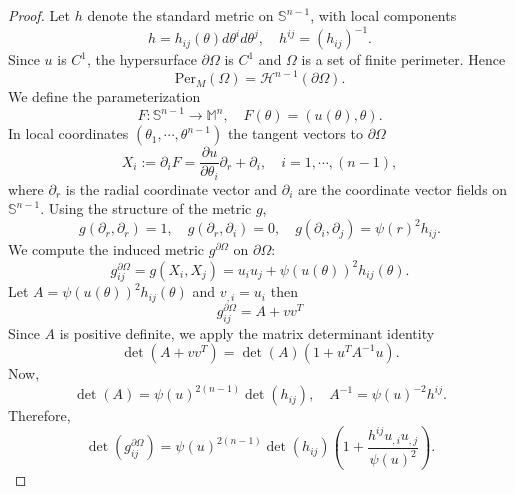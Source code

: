 \documentclass[10pt,a4paper]{amsart}
\newcommand{\m}{\mathbb{M}^n}
\newcommand{\sn}{\mathbb{S}^{n-1}}
\begin{document}
\begin{proof}
    Let $h$ denote the standard metric on $\sn$, with local components
    \begin{equation*}
        h=h_{ij}(\theta)d\theta^id\theta^j,\quad h^{ij}=(h_{ij})^{-1}.
    \end{equation*}
    Since $u$ is $C^1$, the hypersurface $\partial \Omega$ is $C^1$ and $\Omega$ is a set of finite perimeter. Hence
    \begin{equation*}
        \text{Per}_{M}(\Omega)=\mathcal{H}^{n-1}(\partial \Omega).
    \end{equation*}
    We define the parameterization 
    \begin{equation*}
        F: \sn\to \m, \quad F(\theta)=(u(\theta),\theta).
    \end{equation*}
    In local coordinates $(\theta_1,\cdots, \theta^{n-1})$ the tangent vectors to $\partial \Omega$ 
    \begin{equation*}
        X_i:=\partial_i F=\frac{\partial u}{\partial \theta_i}\partial_r+\partial_i,\quad i=1,\cdots, (n-1),
    \end{equation*}
    where $\partial_r$ is the radial coordinate vector and $\partial_i$  are the coordinate vector fields on $\sn$.
Using the structure of the metric $g$,
\begin{equation*}
    g(\partial_r, \partial_r)=1,\quad g(\partial_r, \partial_i)=0,\quad g(\partial_i,\partial_j)=\psi(r)^2h_{ij}.
\end{equation*}
We compute the induced metric $g^{\partial \Omega}$ on $\partial \Omega$: 
\begin{equation*}
    g_{ij}^{\partial \Omega}= g(X_i, X_j)= u_iu_j+\psi(u(\theta))^2h_{ij}(\theta).
\end{equation*}
Let $A=\psi(u(\theta))^2h_{ij}(\theta)$ and $v_{,i}=u_i$ then
\begin{equation*}
    g_{ij}^{\partial \Omega}=A+vv^{T}
\end{equation*}
Since $A$ is positive definite, we apply the matrix determinant identity
\begin{equation*}
    \det(A+vv^T)=\det(A)(1+u^TA^{-1}u).
\end{equation*}
   Now,
   \begin{equation*}
     \det(A)= \psi(u)^{2(n-1)} \det(h_{ij}),\quad A^{-1}=\psi(u)^{-2}h^{ij}.
   \end{equation*}
Therefore,
\begin{equation*}
    \det(g_{ij}^{\partial \Omega})=\psi(u)^{2(n-1)} \det(h_{ij})\left(1+\frac{h^{ij}u_{,i}u_{,j}}{\psi(u)^2}\right).

\end{equation*}
\end{proof}
\end{document}
